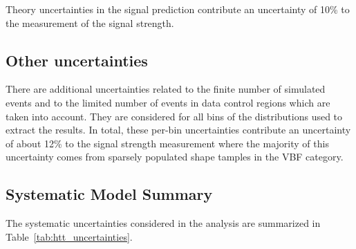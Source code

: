 Theory uncertainties in the signal prediction contribute an uncertainty of 10\% to the measurement of the signal strength.


\subsection{Other uncertainties}
There are additional uncertainties related to the finite number of simulated events and to the limited number 
of events in data control regions which are taken into account. They are considered for all bins of the 
distributions used to extract the results. In total, these per-bin uncertainties contribute an uncertainty of 
about 12\% to the signal strength measurement where the majority of this uncertainty comes from sparsely populated 
shape tamples in the VBF category.


\subsection{Systematic Model Summary}
The systematic uncertainties considered in the analysis are summarized in Table~\ref{tab:htt_uncertainties}.

